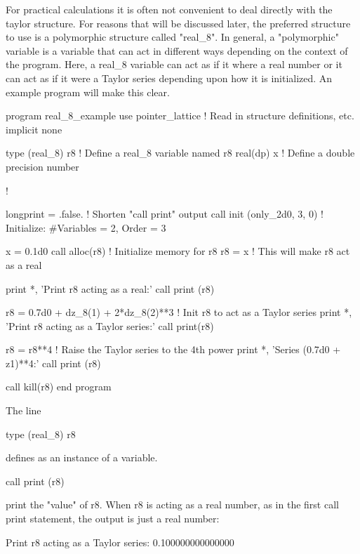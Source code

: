 \documentclass[english,12pt,article]{article} %
\begin{document}
For practical calculations it is often not convenient to deal directly with the taylor structure. For reasons that will be discussed later, the preferred structure to use is a polymorphic structure called "real_8". In general, a "polymorphic" variable is a variable that can act in different ways depending on the context of the program. Here, a real_8 variable can act as if it where a real number or it can act as if it were a Taylor series depending upon how it is initialized.
An example program will make this clear.
\begin{code}
  program real_8_example
  use pointer_lattice   ! Read in structure definitions, etc.
  implicit none

  type (real_8) r8      ! Define a real_8 variable named r8
  real(dp) x            ! Define a double precision number

  !

  longprint = .false.         ! Shorten "call print" output
  call init (only_2d0, 3, 0)  ! Initialize: #Variables = 2, Order = 3

  x = 0.1d0
  call alloc(r8)          ! Initialize memory for r8
  r8 = x                  ! This will make r8 act as a real

  print *, 'Print r8 acting as a real:'
  call print (r8)

  r8 = 0.7d0 + dz_8(1) + 2*dz_8(2)**3 ! Init r8 to act as a Taylor series
  print *, 'Print r8 acting as a Taylor series:'
  call print(r8)

  r8 = r8**4  ! Raise the Taylor series to the 4th power
  print *, 'Series (0.7d0 + z1)**4:'
  call print (r8)

  call kill(r8)
  end program
\end{code}

The line
\begin{example}
  type (real_8) r8
\end{example}
defines  as an instance of a  variable. 

\begin{example}
  call print (r8)
\end{example}
print the "value" of r8. When r8 is acting as a real number, as in the first call print statement, the output is just a real number:
{\scriptsize
\begin{example}
  Print r8 acting as a Taylor series:
  0.100000000000000
\end{example}
}
\end{document}
